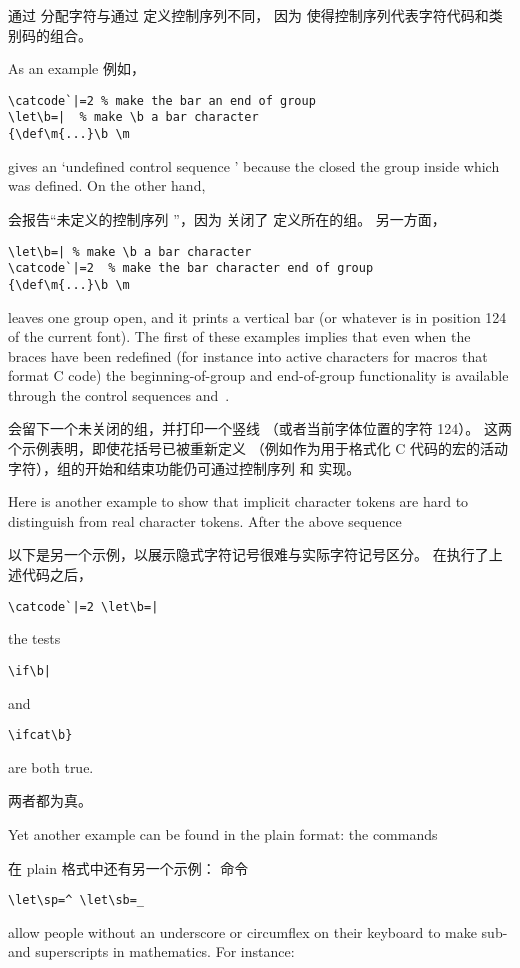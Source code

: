 通过  分配字符与通过  定义控制序列不同，
因为  使得控制序列代表字符代码和类别码的组合。


As an example 例如，
\begin{verbatim}
\catcode`|=2 % make the bar an end of group
\let\b=|  % make \b a bar character
{\def\m{...}\b \m
\end{verbatim}
gives an `undefined control sequence '
because the  closed the group inside which 
was defined. On the other hand,

会报告“未定义的控制序列 ”，因为  关闭了  定义所在的组。 另一方面，
\begin{verbatim}
\let\b=| % make \b a bar character
\catcode`|=2  % make the bar character end of group
{\def\m{...}\b \m
\end{verbatim}
leaves one group open, and it prints a vertical bar
(or whatever is in position 124 of the current font).
The first of these examples
implies that even when the braces have been redefined
(for instance into active characters for macros that
format C code) the beginning-of-group and end-of-group
functionality is available through the control sequences
 and~.

会留下一个未关闭的组，并打印一个竖线
（或者当前字体位置的字符 124）。
这两个示例表明，即使花括号已被重新定义
（例如作为用于格式化 C 代码的宏的活动字符），组的开始和结束功能仍可通过控制序列  和  实现。

Here is
another example to show
that implicit character tokens are hard to distinguish
from real character tokens. After the above sequence

以下是另一个示例，以展示隐式字符记号很难与实际字符记号区分。
在执行了上述代码之后，
\begin{verbatim}
\catcode`|=2 \let\b=|
\end{verbatim}
the tests \begin{verbatim}
\if\b|
\end{verbatim}
and \begin{verbatim}
\ifcat\b}
\end{verbatim}
are both true.

两者都为真。

Yet another example can be found in the plain format:
the commands

在 plain 格式中还有另一个示例：
命令
\begin{verbatim}
\let\sp=^ \let\sb=_ 
\end{verbatim}
allow people without an
underscore or circumflex on their keyboard to 
make sub- and superscripts in mathematics.
For instance:

